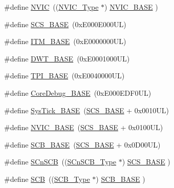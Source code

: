\begin{DoxyCompactItemize}
\item 
\#define \mbox{\hyperlink{group___c_m_s_i_s__core__base_gac8e97e8ce56ae9f57da1363a937f8a17}{N\+V\+IC}}~((\mbox{\hyperlink{struct_n_v_i_c___type}{N\+V\+I\+C\+\_\+\+Type}}      $\ast$)     \mbox{\hyperlink{group___c_m_s_i_s__core__base_gaa0288691785a5f868238e0468b39523d}{N\+V\+I\+C\+\_\+\+B\+A\+SE}}     )
\item 
\#define \mbox{\hyperlink{group___c_m_s_i_s__core__base_ga3c14ed93192c8d9143322bbf77ebf770}{S\+C\+S\+\_\+\+B\+A\+SE}}~(0x\+E000\+E000\+U\+L)
\item 
\#define \mbox{\hyperlink{group___c_m_s_i_s__core__base_gadd76251e412a195ec0a8f47227a8359e}{I\+T\+M\+\_\+\+B\+A\+SE}}~(0x\+E0000000\+U\+L)
\item 
\#define \mbox{\hyperlink{group___c_m_s_i_s__core__base_gafdab534f961bf8935eb456cb7700dcd2}{D\+W\+T\+\_\+\+B\+A\+SE}}~(0x\+E0001000\+U\+L)
\item 
\#define \mbox{\hyperlink{group___c_m_s_i_s__core__base_ga2b1eeff850a7e418844ca847145a1a68}{T\+P\+I\+\_\+\+B\+A\+SE}}~(0x\+E0040000\+U\+L)
\item 
\#define \mbox{\hyperlink{group___c_m_s_i_s__core__base_ga680604dbcda9e9b31a1639fcffe5230b}{Core\+Debug\+\_\+\+B\+A\+SE}}~(0x\+E000\+E\+D\+F0\+U\+L)
\item 
\#define \mbox{\hyperlink{group___c_m_s_i_s__core__base_ga58effaac0b93006b756d33209e814646}{Sys\+Tick\+\_\+\+B\+A\+SE}}~(\mbox{\hyperlink{group___c_m_s_i_s__core__base_ga3c14ed93192c8d9143322bbf77ebf770}{S\+C\+S\+\_\+\+B\+A\+SE}} +  0x0010\+U\+L)
\item 
\#define \mbox{\hyperlink{group___c_m_s_i_s__core__base_gaa0288691785a5f868238e0468b39523d}{N\+V\+I\+C\+\_\+\+B\+A\+SE}}~(\mbox{\hyperlink{group___c_m_s_i_s__core__base_ga3c14ed93192c8d9143322bbf77ebf770}{S\+C\+S\+\_\+\+B\+A\+SE}} +  0x0100\+U\+L)
\item 
\#define \mbox{\hyperlink{group___c_m_s_i_s__core__base_gad55a7ddb8d4b2398b0c1cfec76c0d9fd}{S\+C\+B\+\_\+\+B\+A\+SE}}~(\mbox{\hyperlink{group___c_m_s_i_s__core__base_ga3c14ed93192c8d9143322bbf77ebf770}{S\+C\+S\+\_\+\+B\+A\+SE}} +  0x0\+D00\+U\+L)
\item 
\#define \mbox{\hyperlink{group___c_m_s_i_s__core__base_ga9fe0cd2eef83a8adad94490d9ecca63f}{S\+Cn\+S\+CB}}~((\mbox{\hyperlink{struct_s_cn_s_c_b___type}{S\+Cn\+S\+C\+B\+\_\+\+Type}}    $\ast$)     \mbox{\hyperlink{group___c_m_s_i_s__core__base_ga3c14ed93192c8d9143322bbf77ebf770}{S\+C\+S\+\_\+\+B\+A\+SE}}      )
\item 
\#define \mbox{\hyperlink{group___c_m_s_i_s__core__base_gaaaf6477c2bde2f00f99e3c2fd1060b01}{S\+CB}}~((\mbox{\hyperlink{struct_s_c_b___type}{S\+C\+B\+\_\+\+Type}}       $\ast$)     \mbox{\hyperlink{group___c_m_s_i_s__core__base_gad55a7ddb8d4b2398b0c1cfec76c0d9fd}{S\+C\+B\+\_\+\+B\+A\+SE}}      )

\end{DoxyCompactItemize}
